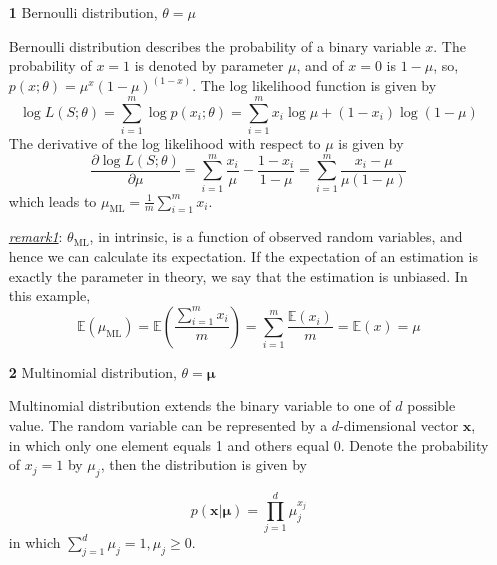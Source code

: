 \documentclass{article}
\begin{document}
	\begin{itemize}
	\item [\textbf{1}] Bernoulli distribution, $\theta={\mu}$
	
	Bernoulli distribution describes the probability of a binary variable $x$. The probability of $x=1$ is denoted by parameter $\mu$, and of $x=0$ is $1-\mu$, so, $p(x;\theta)=\mu^x(1-\mu)^{(1-x)}$. The log likelihood function is given by
	\begin{equation*}
	\log L(S;\theta) = \sum_{i=1}^m \log p(x_i;\theta) = \sum_{i=1}^m x_i\log \mu + (1-x_i)\log(1-\mu)
	\end{equation*}
The derivative of the log likelihood with respect to $\mu$ is given by
	\begin{equation*}
	\frac{\partial \log L(S;\theta)}{\partial \mu} = \sum_{i=1}^m \frac{x_i}{\mu} - \frac{1-x_i}{1-\mu} = \sum_{i=1}^m \frac{x_i-\mu}{\mu(1-\mu)}
	\end{equation*}
which leads to $\mu_{\mathrm{ML}}=\frac{1}{m}\sum_{i=1}^m x_i$.
	\begin{footnotesize}
		
	
	
	\textit{\underline{remark1}}: $\theta_{\mathrm{ML}}$, in intrinsic, is a function of observed random variables, and hence we can calculate its expectation. If the expectation of an estimation is exactly the parameter in theory, we say that the estimation is unbiased. In this example,
	\begin{equation*} 
	\mathbb{E} (\mu_\mathrm{ML}) = \mathbb{E} \left(\frac{\sum_{i=1}^m x_i}{m}\right) =  \sum_{i=1}^m  \frac{\mathbb{E}(x_i)}{m} = \mathbb{E}(x) = \mu
	\end{equation*}
	\end{footnotesize}
		
	
	
	\item [\textbf{2}] Multinomial distribution, $\theta=\bm{\mu}$
	
	Multinomial distribution extends the binary variable to one of $d$ possible value. The random variable can be represented by a $d$-dimensional vector $\bm{x}$, in which only one element equals 1 and others equal 0. Denote the probability of $x_j=1$ by $\mu_j$, then the distribution is given by
	
	\begin{equation*}
	p(\bm{x}|\bm{\mu}) = \prod_{j=1}^d \mu_j^{x_j}
	\end{equation*}
in which $\sum_{j=1}^d \mu_j=1, \mu_j\geq 0$.
		

\end{itemize}
\end{document}
